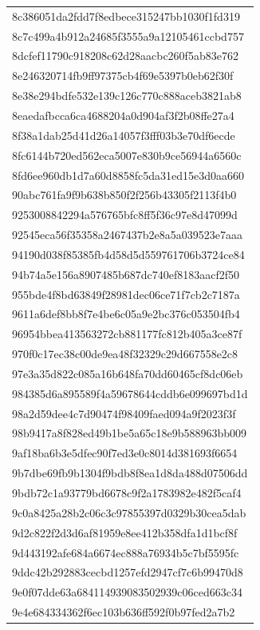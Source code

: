 \begin{tabular}{l}
8c386051da2fdd7f8edbece315247bb1030f1fd319 \\
8c7c499a4b912a24685f3555a9a12105461ccbd757 \\
8dcfef11790c918208c62d28aacbc260f5ab83e762 \\
8e246320714fb9ff97375cb4f69e5397b0eb62f30f \\
8e38e294bdfe532e139c126c770c888aceb3821ab8 \\
8eaedafbcca6ca4688204a0d904af3f2b08ffe27a4 \\
8f38a1dab25d41d26a14057f3fff03b3e70df6ecde \\
8fc6144b720ed562eca5007e830b9ce56944a6560c \\
8fd6ee960db1d7a60d8858fc5da31ed15e3d0aa660 \\
90abc761fa9f9b638b850f2f256b43305f2113f4b0 \\
9253008842294a576765bfc8ff5f36c97e8d47099d \\
92545eca56f35358a2467437b2e8a5a039523e7aaa \\
94190d038f85385fb4d58d5d559761706b3724ce84 \\
94b74a5e156a8907485b687dc740ef8183aacf2f50 \\
955bde4f8bd63849f28981dec06ce71f7cb2c7187a \\
9611a6def8bb8f7e4be6c05a9e2bc376c053504fb4 \\
96954bbea413563272cb881177fc812b405a3ce87f \\
970f0c17ec38c00de9ea48f32329c29d667558e2c8 \\
97e3a35d822c085a16b648fa70dd60465cf8dc06eb \\
984385d6a895589f4a59678644cddb6e099697bd1d \\
98a2d59dee4c7d90474f98409faed094a9f2023f3f \\
98b9417a8f828ed49b1be5a65c18e9b588963bb009 \\
9af18ba6b3e5dfec90f7ed3e0c8014d381693f6654 \\
9b7dbe69fb9b1304f9bdb8f8ea1d8da488d07506dd \\
9bdb72c1a93779bd6678c9f2a1783982e482f5caf4 \\
9c0a8425a28b2c06c3c97855397d0329b30cea5dab \\
9d2c822f2d3d6af81959e8ee412b358dfa1d1bcf8f \\
9d443192afe684a6674ec888a76934b5c7bf5595fc \\
9ddc42b292883cecbd1257efd2947cf7c6b99470d8 \\
9e0f07dde63a684114939083502939c06ced663c34 \\
9e4e684334362f6ec103b636ff592f0b97fed2a7b2 \\

\end{tabular}
